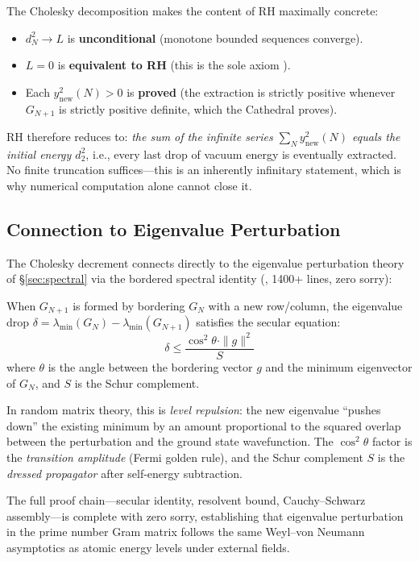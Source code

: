 \begin{remark}
The Cholesky decomposition makes the content of RH maximally concrete:
\begin{itemize}
  \item $d^2_N \to L$ is \textbf{unconditional} (monotone bounded sequences converge).
  \item $L = 0$ is \textbf{equivalent to RH} (this is the sole axiom
    ).
  \item Each $y^2_{\mathrm{new}}(N) > 0$ is \textbf{proved}
    (the extraction is strictly positive whenever $G_{N+1}$ is
    strictly positive definite, which the Cathedral proves).
\end{itemize}
RH therefore reduces to: \emph{the sum of the infinite series
$\sum_N y^2_{\mathrm{new}}(N)$ equals the initial energy $d^2_2$},
i.e., every last drop of vacuum energy is eventually extracted.
No finite truncation suffices---this is an inherently infinitary
statement, which is why numerical computation alone cannot close it.
\end{remark}

\subsection{Connection to Eigenvalue Perturbation}

The Cholesky decrement connects directly to the eigenvalue
perturbation theory of \S\ref{sec:spectral} via the bordered
spectral identity (, 1400+ lines,
zero sorry):

\begin{theorem}
When $G_{N+1}$ is formed by bordering $G_N$ with a new row/column,
the eigenvalue drop
$\delta = \lambda_{\min}(G_N) - \lambda_{\min}(G_{N+1})$ satisfies
the secular equation:
\[
  \delta \leq \frac{\cos^2\theta \cdot \|g\|^2}{S}
\]
where $\theta$ is the angle between the bordering vector $g$ and the
minimum eigenvector of $G_N$, and $S$ is the Schur complement.
\end{theorem}

In random matrix theory, this is \emph{level repulsion}: the new
eigenvalue ``pushes down'' the existing minimum by an amount
proportional to the squared overlap between the perturbation and the
ground state wavefunction. The $\cos^2\theta$ factor is the
\emph{transition amplitude} (Fermi golden rule), and the Schur
complement $S$ is the \emph{dressed propagator} after self-energy
subtraction.

The full proof chain---secular identity, resolvent bound, Cauchy--Schwarz
assembly---is complete with zero sorry, establishing that eigenvalue
perturbation in the prime number Gram matrix follows the same
Weyl--von Neumann asymptotics as atomic energy levels under external
fields.
